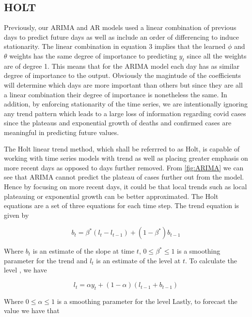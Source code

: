\documentclass[sigconf,nonacm]{acmart}
\begin{document}
\subsection{HOLT}

Previously, our ARIMA and AR models used a linear combination of previous days
to predict future days as well as include an order of differencing to induce
stationarity. The linear combination in equation 3 implies that the learned
$\phi$ and $\theta$ weights has the same degree of importance to predicting
$y_t$ since all the weights are of degree 1. This means that for the ARIMA
model each day has as similar degree of importance to the output. Obviously the
magintude of the coefficients will determine which days are more important than
others but since they are all a linear combination their degree of importance
is nonetheless the same. In addition, by enforcing stationarity of the time
series, we are intentionally ignoring any trend pattern which leads to a large
loss of information regarding covid cases since the plateaus and exponential
growth of deaths and confirmed cases are meaningful in predicting future
values.

The Holt linear trend method, which shall be referrred to as Holt, is capable
of working with time series models with trend as well as placing greater
emphasis on more recent days as opposed to days further removed. From
\ref{fig:ARIMA} we can see that ARIMA cannot predict the plateau of cases
further out from the model. Hence by focusing on more recent days, it could be
that local trends such as local plateauing or exponential growth can be better
approximated. The Holt equations are a set of three equations for each time
step. The trend equation \cite{forecasting} is given by

\begin{equation}
b_t = \beta^*(l_t - l_{t-1}) + (1-\beta^*)b_{t-1}
\end{equation}

Where $b_t$ is an estimate of the slope at time $t$, $0 \leq \beta^* \leq 1$ is
a smoothing parameter for the trend and $l_t$ is an estimate of the level at
$t$. To calculate the level \cite{forecasting}, we have

\begin{equation}
l_t = \alpha y_t + (1 - \alpha)(l_{t-1} + b_{t-1})
\end{equation}

Where $0 \leq \alpha \leq 1$ is a smoothing parameter for the level Lastly, to
forecast the value \cite{forecasting} we have that
\end{document}
